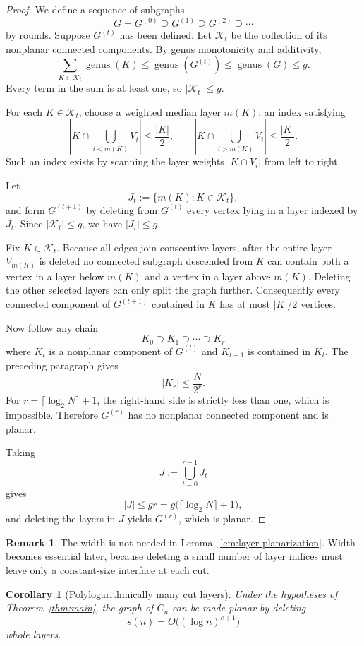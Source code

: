 \documentclass[11pt]{article}
\newtheorem{corollary}[theorem]{Corollary}
\theoremstyle{definition}
\newtheorem{remark}[theorem]{Remark}
\newcommand{\genus}{\operatorname{genus}}
\newcommand{\cK}{\mathcal{K}}
\begin{document}
\begin{proof}
We define a sequence of subgraphs
\[
  G=G^{(0)}\supseteq G^{(1)}\supseteq G^{(2)}\supseteq\cdots
\]
by rounds. Suppose $G^{(t)}$ has been defined. Let $\cK_t$ be the collection of its nonplanar connected components. By genus monotonicity and additivity,
\[
  \sum_{K\in\cK_t}\genus(K)
  \le \genus(G^{(t)})
  \le \genus(G)
  \le g.
\]
Every term in the sum is at least one, so $|\cK_t|\le g$.

For each $K\in\cK_t$, choose a weighted median layer $m(K)$: an index satisfying
\[
 \left|K\cap\bigcup_{i<m(K)}V_i\right|\le \frac{|K|}{2},
 \qquad
 \left|K\cap\bigcup_{i>m(K)}V_i\right|\le \frac{|K|}{2}.
\]
Such an index exists by scanning the layer weights $|K\cap V_i|$ from left to right.

Let
\[
  J_t:=\{m(K):K\in\cK_t\},
\]
and form $G^{(t+1)}$ by deleting from $G^{(t)}$ every vertex lying in a layer indexed by $J_t$. Since $|\cK_t|\le g$, we have $|J_t|\le g$.

Fix $K\in\cK_t$. Because all edges join consecutive layers, after the entire layer $V_{m(K)}$ is deleted no connected subgraph descended from $K$ can contain both a vertex in a layer below $m(K)$ and a vertex in a layer above $m(K)$. Deleting the other selected layers can only split the graph further. Consequently every connected component of $G^{(t+1)}$ contained in $K$ has at most $|K|/2$ vertices.

Now follow any chain
\[
  K_0\supset K_1\supset\cdots\supset K_r
\]
where $K_t$ is a nonplanar component of $G^{(t)}$ and $K_{t+1}$ is contained in $K_t$. The preceding paragraph gives
\[
  |K_r|\le \frac{N}{2^r}.
\]
For $r=\lceil\log_2 N\rceil+1$, the right-hand side is strictly less than one, which is impossible. Therefore $G^{(r)}$ has no nonplanar connected component and is planar.

Taking
\[
  J:=\bigcup_{t=0}^{r-1}J_t
\]
gives
\[
  |J|\le gr=g\bigl(\lceil\log_2 N\rceil+1\bigr),
\]
and deleting the layers in $J$ yields $G^{(r)}$, which is planar.
\end{proof}

\begin{remark}
The width is not needed in Lemma~\ref{lem:layer-planarization}. Width becomes essential later, because deleting a small number of layer indices must leave only a constant-size interface at each cut.
\end{remark}

\begin{corollary}[Polylogarithmically many cut layers]\label{cor:polylog-cuts}
Under the hypotheses of Theorem~\ref{thm:main}, the graph of $C_n$ can be made planar by deleting
\[
  s(n)=O\bigl((\log n)^{c+1}\bigr)
\]
whole layers.
\end{corollary}
\end{document}
